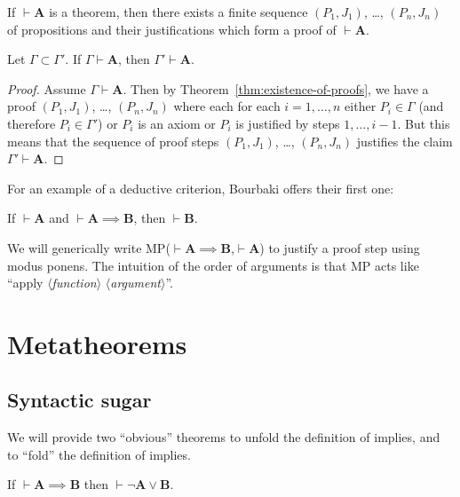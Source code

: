 \documentclass{amsart}%
\newcommand\metavariable[1]{\boldsymbol{#1}}
\begin{document}
\begin{theorem}\label{thm:existence-of-proofs}
If $\vdash\metavariable{A}$ is a theorem,
then there exists a finite sequence $(P_{1},J_{1})$, \dots, $(P_{n},J_{n})$ of
propositions and their justifications which form a proof of
$\vdash\metavariable{A}$.
\end{theorem}

\begin{theorem}[Weakening]
Let $\Gamma\subset\Gamma'$.
If $\Gamma\vdash\metavariable{A}$, then $\Gamma'\vdash\metavariable{A}$.
\end{theorem}

\begin{proof}
Assume $\Gamma\vdash\metavariable{A}$.
Then by Theorem~\ref{thm:existence-of-proofs}, we have a proof
$(P_{1},J_{1})$, \dots, $(P_{n},J_{n})$ where each for each
$i=1,\dots,n$ either $P_{i}\in\Gamma$ (and therefore $P_{i}\in\Gamma'$)
or $P_{i}$ is an axiom or $P_{i}$ is justified by steps $1,\dots,i-1$.
But this means that the sequence of proof steps
$(P_{1},J_{1})$, \dots, $(P_{n},J_{n})$ justifies the claim
$\Gamma'\vdash\metavariable{A}$.
\end{proof}

For an example of a deductive criterion, Bourbaki offers their first one:

\begin{dc}[Syllogism]
If $\vdash\metavariable{A}$ and $\vdash\metavariable{A}\implies\metavariable{B}$,
then $\vdash\metavariable{B}$.
\end{dc}

We will generically write MP($\vdash\metavariable{A}\implies\metavariable{B}$,$\vdash\metavariable{A}$)
to justify a proof step using modus ponens. The intuition of the order
of arguments is that MP acts like ``apply $\langle$\textit{function}$\rangle$
$\langle$\textit{argument}$\rangle$''.

\setcounter{dc}{5}

\section{Metatheorems}

\subsection{Syntactic sugar} We will provide two ``obvious'' theorems to
unfold the definition of implies, and to ``fold'' the definition of implies.

\begin{syn}\label{unfold-implies}
If $\vdash\metavariable{A}\implies\metavariable{B}$
then $\vdash\neg\metavariable{A}\lor\metavariable{B}$.
\end{syn}
\end{document}
